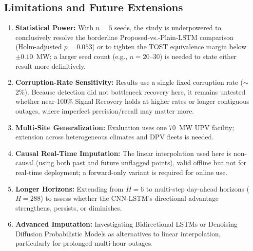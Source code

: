 \documentclass[conference]{IEEEtran}
\begin{document}
\subsection*{Limitations and Future Extensions}
\begin{enumerate}
    \item \textbf{Statistical Power:} With $n=5$ seeds, the study is underpowered to conclusively resolve the borderline Proposed-vs.-Plain-LSTM comparison (Holm-adjusted $p=0.053$) or to tighten the TOST equivalence margin below $\pm0.10$~MW; a larger seed count (e.g., $n=20$--$30$) is needed to state either result more definitively.
    \item \textbf{Corruption-Rate Sensitivity:} Results use a single fixed corruption rate ($\sim$2\%). Because detection did not bottleneck recovery here, it remains untested whether near-100\% Signal Recovery holds at higher rates or longer contiguous outages, where imperfect precision/recall may matter more.
    \item \textbf{Multi-Site Generalization:} Evaluation uses one 70~MW UPV facility; extension across heterogeneous climates and DPV fleets is needed.
    \item \textbf{Causal Real-Time Imputation:} The linear interpolation used here is non-causal (using both past and future unflagged points), valid offline but not for real-time deployment; a forward-only variant is required for online use.
    \item \textbf{Longer Horizons:} Extending from $H=6$ to multi-step day-ahead horizons ($H=288$) to assess whether the CNN-LSTM's directional advantage strengthens, persists, or diminishes.
    \item \textbf{Advanced Imputation:} Investigating Bidirectional LSTMs or Denoising Diffusion Probabilistic Models as alternatives to linear interpolation, particularly for prolonged multi-hour outages.
\end{enumerate}
\end{document}
